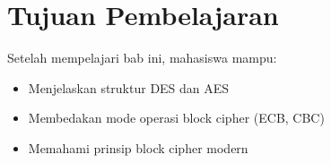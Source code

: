 \section*{Tujuan Pembelajaran}
Setelah mempelajari bab ini, mahasiswa mampu:
\begin{itemize}
\item Menjelaskan struktur DES dan AES
\item Membedakan mode operasi block cipher (ECB, CBC)
\item Memahami prinsip block cipher modern
\end{itemize}
